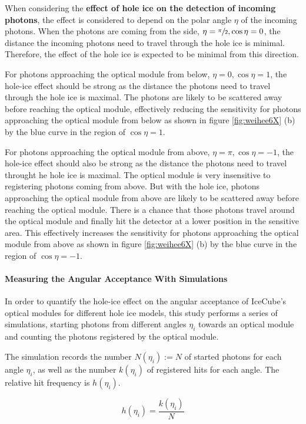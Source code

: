 When considering the \textbf{effect of hole ice on the detection of incoming photons}, the effect is considered to depend on the polar angle $\eta$ of the incoming photons. When the photons are coming from the side, $\eta = \sfrac{\pi}{2}, \cos \eta = 0$, the distance the incoming photons need to travel through the hole ice is minimal. Therefore, the effect of the hole ice is expected to be minimal from this direction.

For photons approaching the optical module from below, $\eta = 0, \cos \eta = 1$, the hole-ice effect should be strong as the distance the photons need to travel through the hole ice is maximal. The photons are likely to be scattered away before reaching the optical module, effectively reducing the sensitivity for photons approaching the optical module from below as shown in figure \ref{fig:weihee6X} (b) by the blue curve in the region of $\cos \eta = 1$.

For photons approaching the optical module from above, $\eta = \pi, \cos \eta = -1$, the hole-ice effect should also be strong as the distance the photons need to travel throught he hole ice is maximal. The optical module is very insensitive to registering photons coming from above. But with the hole ice, photons approaching the optical module from above are likely to be scattered away before reaching the optical module. There is a chance that those photons travel around the optical module and finally hit the detector at a lower position in the sensitive area. This effectively increases the sensitivity for photons approaching the optical module from above as shown in figure \ref{fig:weihee6X} (b) by the blue curve in the region of $\cos \eta = -1$.


\paragraph{Measuring the Angular Acceptance With Simulations}
In order to quantify the hole-ice effect on the angular acceptance of IceCube's optical modules for different hole ice models, this study performs a series of simulations, starting photons from different angles $\eta_i$ towards an optical module and counting the photons registered by the optical module.

The simulation records the number $N(\eta_i):= N$ of started photons for each angle $\eta_i$, as well as the number $k(\eta_i)$ of registered hits for each angle. The relative hit frequency is $h(\eta_i)$.

\begin{equation}
  h(\eta_i) = \frac{k(\eta_i)}{N}
\end{equation}

